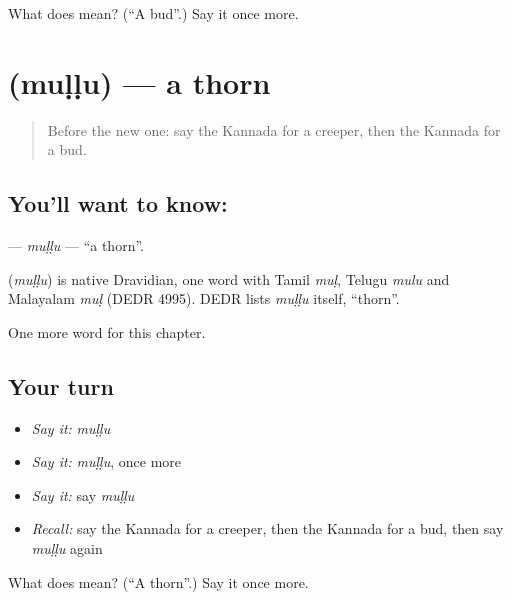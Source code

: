 \begin{tcolorbox}[breakable,colback=teal!4,colframe=teal!35!black,title={Before you move on}]
What does  mean? (\textquotedblleft{}A bud\textquotedblright{}.) Say it once more.
\end{tcolorbox}
\section[\texorpdfstring{\kn{ಮುಳ್ಳು} (muḷḷu)}{ಮುಳ್ಳು (muḷḷu)}]{ (muḷḷu) — a thorn}

\label{lesson:KA-C188-mullu}



\begin{quote}
Before the new one: say the Kannada for a creeper, then the Kannada for a bud.
\end{quote}

\subsection*{You'll want to know: }
\textbf{} — \emph{muḷḷu} — \textquotedblleft{}a thorn\textquotedblright{}.

\begin{cousinweb}
\textbf{} (\emph{muḷḷu}) is native Dravidian, one word with Tamil \emph{muḷ}, Telugu \emph{mulu} and Malayalam \emph{muḷ} (DEDR 4995). DEDR lists \emph{muḷḷu} itself, \textquotedblleft{}thorn\textquotedblright{}.
\end{cousinweb}

\begin{grammarlens}[title={What you've built}]
One more word for this chapter.
\end{grammarlens}

\subsection*{Your turn}
\begin{itemize}
\raggedright
  \item \emph{Say it:} \emph{muḷḷu}
  \item \emph{Say it:} \emph{muḷḷu}, once more
  \item \emph{Say it:} say \emph{muḷḷu}
  \item \emph{Recall:} say the Kannada for a creeper, then the Kannada for a bud, then say \emph{muḷḷu} again
\end{itemize}

\begin{tcolorbox}[breakable,colback=teal!4,colframe=teal!35!black,title={Before you move on}]
What does  mean? (\textquotedblleft{}A thorn\textquotedblright{}.) Say it once more.
\end{tcolorbox}

